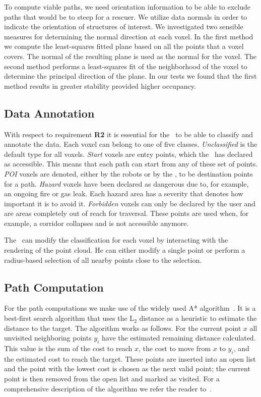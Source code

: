 To compute viable paths, we need orientation information to be able to exclude paths that would be to steep for a rescuer. We utilize data normals in order to indicate the orientation of structures of interest. We investigated two sensible measures for determining the normal direction at each voxel. In the first method we compute the least-squares fitted plane based on all the points that a voxel covers. The normal of the resulting plane is used as the normal for the voxel. The second method performs a least-squares fit of the neighborhood of the voxel to determine the principal direction of the plane. In our tests we found that the first method results in greater stability provided higher occupancy.

\subsection{Data Annotation} \label{sec:overview:classification}
With respect to requirement {\bfseries R2} it is essential for the \IC\ to be able to classify and annotate the data. Each voxel can belong to one of five classes. \emph{Unclassified} is the default type for all voxels. \emph{Start} voxels are entry points, which the \IC\ has declared as accessible. This means that each path can start from any of these set of points. \emph{POI} voxels are denoted, either by the robots or by the \IC, to be destination points for a path. \emph{Hazard} voxels have been declared as dangerous due to, for example, an ongoing fire or gas leak. Each hazard area has a severity that denotes how important it is to avoid it. \emph{Forbidden} voxels can only be declared by the user and are areas completely out of reach for traversal. These points are used when, for example, a corridor collapses and is not accessible anymore.

The \IC\ can modify the classification for each voxel by interacting with the rendering of the point cloud. He can either modify a single point or perform a radius-based selection of all nearby points close to the selection. 

\subsection{Path Computation} \label{sec:overview:path}
For the path computations we make use of the widely used A* algorithm~\cite{4082128}. It is a best-first search algorithm that uses the L$_2$ distance as a heuristic to estimate the distance to the target. The algorithm works as follows. For the current point $x$ all unvisited neighboring points $y_i$ have the estimated remaining distance calculated. This value is the sum of the cost to reach $x$, the cost to move from $x$ to $y_i$, and the estimated cost to reach the target. These points are inserted into an open list and the point with the lowest cost is chosen as the next valid point; the current point is then removed from the open list and marked as visited. For a comprehensive description of the algorithm we refer the reader to~\cite{AStar}.


